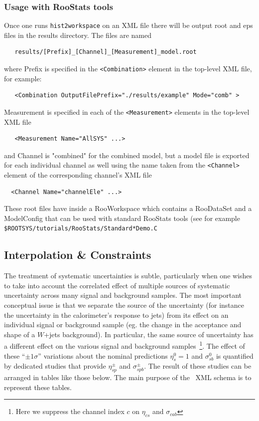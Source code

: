 \subsubsection{Usage with RooStats tools}

Once one runs \texttt{hist2workspace} on an XML file there will be output root and eps files in the results directory.  The files are named
\begin{verbatim}
   results/[Prefix]_[Channel]_[Measurement]_model.root
\end{verbatim}
where Prefix is specified in the \texttt{<Combination>} element in the top-level XML file, for example:
\begin{verbatim}
   <Combination OutputFilePrefix="./results/example" Mode="comb" >
\end{verbatim}
Measurement is specified in each of the \texttt{<Measurement>} elements in the top-level XML file
\begin{verbatim}
   <Measurement Name="AllSYS" ...>
\end{verbatim}
and Channel  is "combined" for the combined model, but a model file is exported for each individual channel as well using the name taken from the  \texttt{<Channel>} element of the corresponding channel's XML file
\begin{verbatim}
  <Channel Name="channelEle" ...>
\end{verbatim}


These root files have inside a RooWorkspace which contains a RooDataSet and a ModelConfig that can be used with standard RooStats tools (see for example \texttt{\$ROOTSYS/tutorials/RooStats/Standard*Demo.C}


\newpage
\subsection{Interpolation \& Constraints}

The treatment of systematic uncertainties is subtle, particularly when one wishes to take into account the correlated effect of multiple sources of systematic uncertainty across many signal and background samples.   
The most important conceptual issue is that we separate the source of the uncertainty (for instance the uncertainty in the calorimeter's response to jets) from its effect on an individual signal or background sample (eg. the change in the acceptance and shape of a $W$+jets background).  In particular, the same source of uncertainty has a different effect on the various signal and background samples~\footnote{Here we suppress the channel index $c$ on $\eta_{cs}$ and $\sigma_{cab}$}.  The effect of these ``$\pm 1\sigma$'' variations about the nominal predictions $\eta_s^0=1$  and $\sigma_{sb}^0$ is quantified by dedicated studies that provide $\eta_{sp}^\pm$ and $\sigma_{spb}^\pm$.  The result of these studies can be arranged in tables like those below.  The main purpose of the \HF\ XML schema is to represent these tables.

